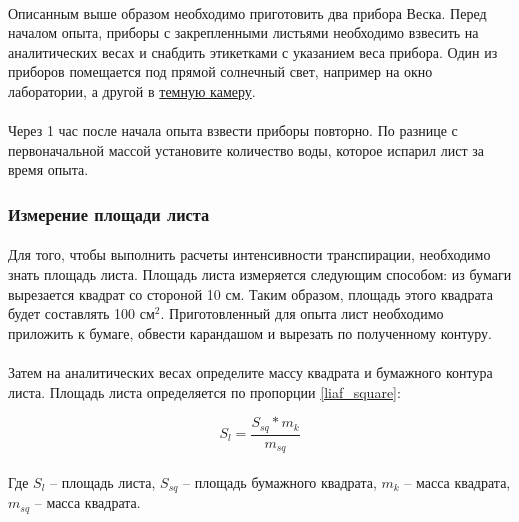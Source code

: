 \paragraph*{}Описанным выше образом необходимо приготовить два прибора Веска. Перед началом опыта, приборы с закрепленными листьями необходимо взвесить на аналитических весах и снабдить этикетками с указанием веса прибора. Один из приборов помещается под прямой солнечный свет, например на окно лаборатории, а другой в \hyperlink{light_dark_diferences}{темную камеру}. 

\paragraph*{}Через 1 час после начала опыта взвести приборы повторно. По разнице с первоначальной массой установите количество воды, которое испарил лист за время опыта.

\subsubsection*{Измерение площади листа}

\paragraph*{}Для того, чтобы выполнить расчеты интенсивности транспирации, необходимо знать площадь листа. Площадь листа измеряется следующим способом: из бумаги вырезается квадрат со стороной 10 см. Таким образом, площадь этого квадрата будет составлять 100 см$^2$. Приготовленный для опыта лист необходимо приложить к бумаге, обвести карандашом и вырезать по полученному контуру. 

\paragraph*{}Затем на аналитических весах определите массу квадрата и бумажного контура листа. Площадь листа определяется по пропорции \ref{liaf_square}: 

\begin{equation}
  \label{liaf_square}
  S_l = \frac{S_{sq} * m_k}
                 {m_{sq}}
\end{equation}

\paragraph*{}Где $S_{l}$ – площадь листа, $S_{sq}$ – площадь бумажного квадрата, $m_k$ – масса квадрата, $m_{sq}$ – масса квадрата.

